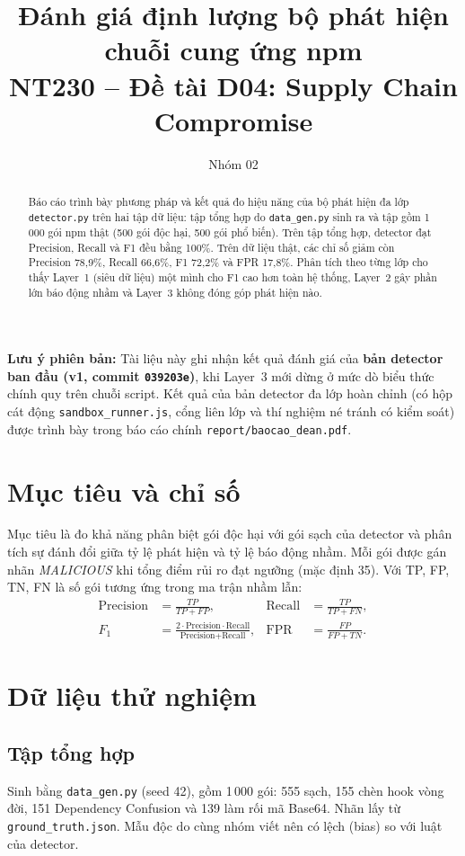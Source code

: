 \documentclass[12pt,a4paper]{article}
\title{\textbf{Đánh giá định lượng bộ phát hiện chuỗi cung ứng npm}\\[2pt]
\large NT230 -- Đề tài D04: Supply Chain Compromise}
\author{Nhóm 02}
\date{}
\begin{document}
\maketitle

\noindent\textbf{Lưu ý phiên bản:} Tài liệu này ghi nhận kết quả đánh giá của \textbf{bản detector ban đầu (v1, commit \texttt{039203e})}, khi Layer~3 mới dừng ở mức dò biểu thức chính quy trên chuỗi script. Kết quả của bản detector đa lớp hoàn chỉnh (có hộp cát động \texttt{sandbox\_runner.js}, cổng liên lớp và thí nghiệm né tránh có kiểm soát) được trình bày trong báo cáo chính \texttt{report/baocao\_dean.pdf}.

\begin{abstract}
Báo cáo trình bày phương pháp và kết quả đo hiệu năng của bộ phát hiện đa lớp \texttt{detector.py} trên hai tập dữ liệu: tập tổng hợp do \texttt{data\_gen.py} sinh ra và tập gồm 1\,000 gói npm thật (500 gói độc hại, 500 gói phổ biến). Trên tập tổng hợp, detector đạt Precision, Recall và F1 đều bằng 100\%. Trên dữ liệu thật, các chỉ số giảm còn Precision 78{,}9\%, Recall 66{,}6\%, F1 72{,}2\% và FPR 17{,}8\%. Phân tích theo từng lớp cho thấy Layer~1 (siêu dữ liệu) một mình cho F1 cao hơn toàn hệ thống, Layer~2 gây phần lớn báo động nhầm và Layer~3 không đóng góp phát hiện nào.
\end{abstract}

\section{Mục tiêu và chỉ số}
Mục tiêu là đo khả năng phân biệt gói độc hại với gói sạch của detector và phân tích sự đánh đổi giữa tỷ lệ phát hiện và tỷ lệ báo động nhầm. Mỗi gói được gán nhãn \textit{MALICIOUS} khi tổng điểm rủi ro đạt ngưỡng (mặc định 35). Với TP, FP, TN, FN là số gói tương ứng trong ma trận nhầm lẫn:
\begin{align*}
\text{Precision} &= \frac{TP}{TP+FP}, &
\text{Recall} &= \frac{TP}{TP+FN},\\
F_1 &= \frac{2\cdot \text{Precision}\cdot\text{Recall}}{\text{Precision}+\text{Recall}}, &
\text{FPR} &= \frac{FP}{FP+TN}.
\end{align*}

\section{Dữ liệu thử nghiệm}
\subsection{Tập tổng hợp}
Sinh bằng \texttt{data\_gen.py} (seed 42), gồm 1\,000 gói: 555 sạch, 155 chèn hook vòng đời, 151 Dependency Confusion và 139 làm rối mã Base64. Nhãn lấy từ \texttt{ground\_truth.json}. Mẫu độc do cùng nhóm viết nên có lệch (bias) so với luật của detector.
\end{document}
